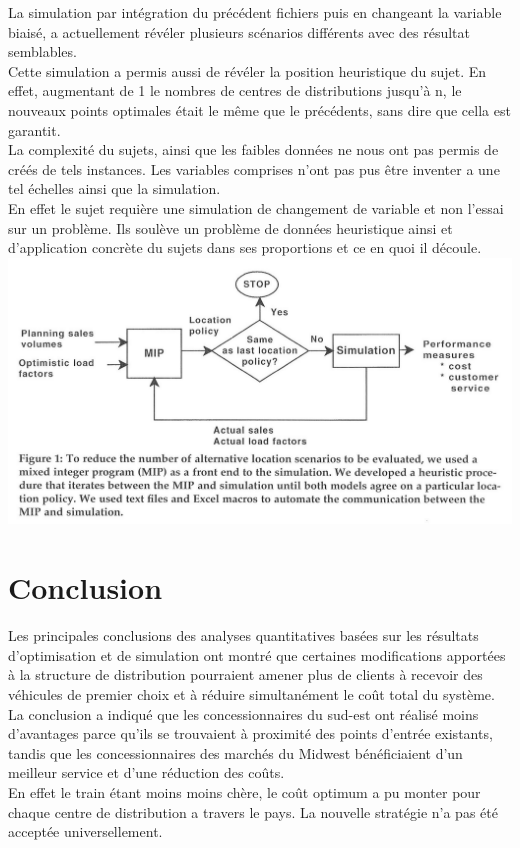 \documentclass{ceri}
\begin{document}
	La simulation par intégration du précédent fichiers puis en changeant la variable biaisé, a actuellement révéler plusieurs scénarios différents avec des résultat semblables.\\
	Cette simulation a permis aussi de révéler la position heuristique du sujet. En effet, augmentant de 1 le nombres de centres de distributions jusqu’à n, le nouveaux points optimales était le même que le précédents, sans dire que cella est garantit.\\
	La complexité du sujets, ainsi que les faibles données ne nous ont pas permis de créés de tels instances. Les variables comprises n’ont pas pus être inventer a une tel échelles ainsi que la simulation. \\
	En effet le sujet requière une simulation de changement de variable et non l’essai sur un problème. Ils soulève un problème de données heuristique ainsi et d’application concrète du sujets dans ses proportions et ce en quoi il découle.\\
    
    
\includegraphics[width=15cm]{donnee.jpg}

\clearpage
\bigskip

\section{Conclusion}

Les principales conclusions des analyses quantitatives basées sur les résultats d'optimisation et de simulation ont montré que certaines modifications apportées à la structure de distribution pourraient amener plus de clients à recevoir des véhicules de premier choix et à réduire simultanément le coût total du système.\\

La conclusion a indiqué que les concessionnaires du sud-est ont réalisé moins d'avantages parce qu'ils se trouvaient à proximité des points d'entrée existants, tandis que les concessionnaires des marchés du Midwest bénéficiaient d'un meilleur service et d'une réduction des coûts.\\
En effet le train étant moins moins chère, le coût optimum a pu monter pour chaque centre de distribution a travers le pays. La nouvelle stratégie n'a pas été acceptée universellement.\\
\end{document}
